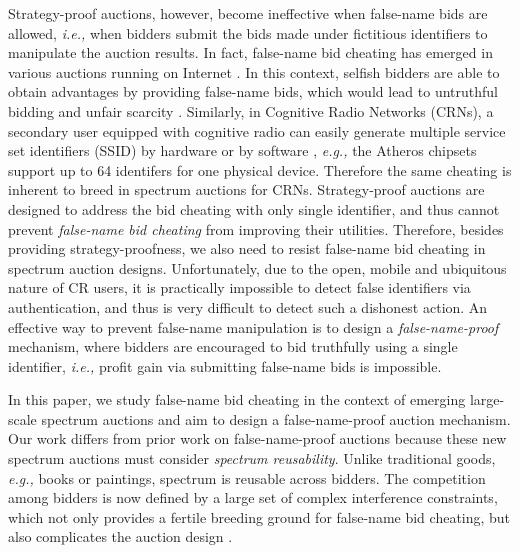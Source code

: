 \documentclass{sig-alternate}
\begin{document}
Strategy-proof auctions, however, become ineffective when false-name bids are allowed, \emph{i.e.,} when bidders submit the bids made under fictitious identifiers to manipulate the auction results.
In fact, false-name bid cheating has emerged in various auctions running on Internet \cite{Yokoo:ICDCS:00,Yokoo:GEB:04}. In this context, selfish bidders are able to obtain advantages by providing false-name bids, which would lead to untruthful bidding and unfair scarcity \cite{Yokoo:GEB:04}. Similarly, in Cognitive Radio Networks (CRNs), a secondary user equipped with cognitive radio can easily generate multiple service set identifiers (SSID) by hardware or by software \cite{Clancy:08,ICC11:Tan,MILCOM:13}, \emph{e.g.,} the Atheros chipsets support up to 64 identifers for one physical device.
Therefore the same cheating is inherent to breed in spectrum auctions for CRNs. Strategy-proof auctions are designed to address the bid cheating with only single identifier, and thus cannot prevent \emph{false-name bid cheating} from improving their utilities. Therefore, besides providing strategy-proofness, we also need to resist false-name bid cheating in spectrum auction designs. Unfortunately, due to the open, mobile and ubiquitous nature of CR users, it is practically impossible to detect false identifiers via authentication, and thus is very difficult to detect such a dishonest action. An effective way to prevent false-name manipulation is to design a \emph{false-name-proof} mechanism, where bidders are encouraged to bid truthfully using a single identifier, \emph{i.e.,} profit gain via submitting false-name bids is impossible.

In this paper, we study false-name bid cheating in the context of emerging large-scale spectrum auctions and aim to design a false-name-proof auction mechanism. Our work differs from prior work on false-name-proof auctions \cite{Terada:03:AAMAS,Yokoo:ijcai:01} because these new spectrum auctions must consider \emph{spectrum reusability}. Unlike traditional goods, \emph{e.g.,} books or paintings, spectrum is reusable across bidders. The competition among bidders is now defined by a large set of complex interference constraints, which not only provides a fertile breeding ground
for false-name bid cheating, but also complicates the auction design \cite{Mobicom08:Zhou}.
\end{document}
